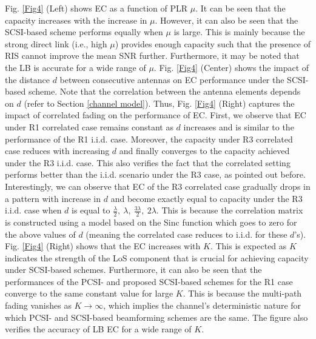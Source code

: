 \documentclass[journal,draftclsnofoot,onecolumn,12pt]{IEEEtran}
\begin{document}
Fig. \ref{Fig4} (Left) shows EC as a function of PLR $\mu$. It can be seen that the capacity increases with the increase in $\mu$. However, it can also be seen that the SCSI-based scheme performs equally when $\mu$ is large. This is mainly because the strong direct link (i.e., high $\mu$) provides enough capacity such that the presence of RIS cannot improve the mean SNR  further. Furthermore, it may be noted that the LB is accurate for a wide range of $\mu$.  
Fig. \ref{Fig4} (Center) shows the impact of the distance $d$ between consecutive antennas on EC performance under the SCSI-based scheme. Note that the correlation between the antenna elements depends on $d$ (refer to Section \ref{channel model}). Thus, Fig. \ref{Fig4} (Right) captures the impact of correlated fading on the performance of EC. First, we observe that EC under R1 correlated case remains constant as $d$ increases and is similar to the performance of the R1 {\rm i.i.d.} case. Moreover, the capacity under R3 correlated case reduces with increasing $d$ and finally converges to the capacity achieved under the R3 {\rm i.i.d.} case. This also verifies the fact that the correlated setting performs better than the {\rm i.i.d.} scenario under the R3 case, as pointed out before. Interestingly, we can observe that EC of the R3 correlated case gradually drops in a pattern with increase in $d$ and become exactly equal to capacity under the R3 {\rm i.i.d.} case when $d$ is equal to $\frac{\lambda}{2},~\lambda,~\frac{3\lambda}{2},~2 \lambda$. This is because the correlation matrix is constructed using a model based on the Sinc function which goes to zero for the above values of $d$ (meaning the correlated case reduces to  {\rm i.i.d.} for these $d$'s).
Fig. \ref{Fig4} (Right) shows that the EC increases with $K$. This is expected as $K$ indicates the strength of the LoS component that is crucial for achieving capacity under SCSI-based schemes. Furthermore, it can also be seen that the performances of the PCSI- and proposed SCSI-based schemes for the R1 case converge to the same constant value for large $K$. This is because the multi-path fading vanishes as $K \to \infty$, which implies the channel's deterministic nature for which PCSI- and SCSI-based beamforming schemes are the same. The figure also verifies the accuracy of LB EC  for a wide range of $K$.  
\vspace{-0.3cm}
\end{document}

